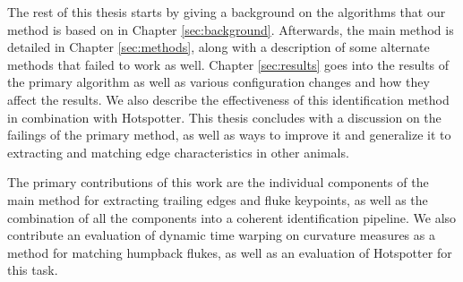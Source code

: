 The rest of this thesis starts by giving a background on the algorithms that our method is based on in Chapter \ref{sec:background}.
Afterwards, the main method is detailed in Chapter \ref{sec:methods}, along with a description of some alternate methods that failed to work as well.
Chapter \ref{sec:results} goes into the results of the primary algorithm as well as various configuration changes and how they affect the results.
We also describe the effectiveness of this identification method in combination with Hotspotter.
This thesis concludes with a discussion on the failings of the primary method, as well as ways to improve it and generalize it to extracting and matching edge characteristics in other animals.

The primary contributions of this work are the individual components of the main method for extracting trailing edges and fluke keypoints, as well as the combination of all the components into a coherent identification pipeline.
We also contribute an evaluation of dynamic time warping on curvature measures as a method for matching humpback flukes, as well as an evaluation of Hotspotter for this task.










